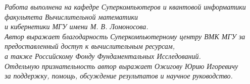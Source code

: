\thispagestyle{empty}

\begin{vplace}[0.5]
	\begin{center}
		\textit{
			Работа выполнена на кафедре Суперкомпьютеров и квантовой информа­тики факультета Вычислительной математики\\и кибернетики МГУ имени М. В. Ломоносова.
			\\[72pt]
			Автор выражает благодарность Суперкомпьютерному центру ВМК МГУ за предоставленный доступ к вычислительным ресурсам,\\а также Российскому Фонду Фундаментальных Исследований.
			\\[24pt]
			Отдельную признательность автор выражает Ожигову Юрию Игоревичу\\за поддержку, помощь, обсуждение результатов и научное руководство.
		}
	\end{center}
\end{vplace}
